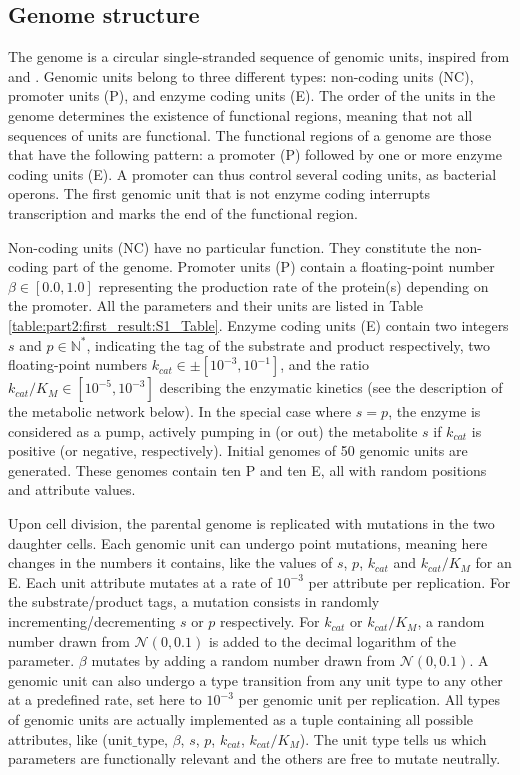 
\subsection{Genome structure}

The genome is a circular single-stranded sequence of genomic units, inspired from \cite{crombach-hogeweg-2008} and \cite{beslon-et-al-2010a}. Genomic units belong to three different types: non-coding units (NC), promoter units (P), and enzyme coding units (E). The order of the units in the genome determines the existence of functional regions, meaning that not all sequences of units are functional. The functional regions of a genome are those that have the following pattern: a promoter (P) followed by one or more enzyme coding units (E). A promoter can thus control several coding units, as bacterial operons. The first genomic unit that is not enzyme coding interrupts transcription and marks the end of the functional region. 

Non-coding units (NC) have no particular function. They constitute the non-coding part of the genome. Promoter units (P) contain a floating-point number $\beta \in [0.0, 1.0]$ representing the production rate of the protein(s) depending on the promoter.
All the parameters and their units are listed in Table \ref{table:part2:first_result:S1_Table}.
Enzyme coding units (E) contain two integers $s$ and $p \in \mathbb{N}^*$, indicating the tag of the substrate and product respectively, two floating-point numbers $k_{cat} \in \pm[10^{-3}, 10^{-1}]$, and the ratio $k_{cat}/K_M \in [10^{-5}, 10^{-3}]$ describing the enzymatic kinetics (see the description of the metabolic network below). In the special case where $s =p$, the enzyme is considered as a pump, actively pumping in (or out) the metabolite $s$ if $k_{cat}$ is positive (or negative, respectively).
Initial genomes of 50 genomic units are generated. These genomes contain ten P and ten E, all with random positions and attribute values.
 
Upon cell division, the parental genome is replicated with mutations in the two daughter cells. Each genomic unit can undergo point mutations, meaning here changes in the numbers it contains, like the values of $s$, $p$, $k_{cat}$ and $k_{cat}/K_M$ for an E. Each unit attribute mutates at a rate of $10^{-3}$ per attribute per replication.
For the substrate/product tags, a mutation consists in randomly incrementing/decrementing $s$ or $p$ respectively.
For $k_{cat}$ or $k_{cat}/K_M$, a random number drawn from $\mathcal{N}(0, 0.1)$ is added to the decimal logarithm of the parameter.
$\beta$ mutates by adding a random number drawn from $\mathcal{N}(0, 0.1)$.
A genomic unit can also undergo a type transition from any unit type to any other at a predefined rate, set here to $10^{-3}$ per genomic unit per replication. All types of genomic units are actually implemented as a tuple containing all possible attributes, like ($\text{unit\_type}$, $\beta$, $s$, $p$, $k_{cat}$, $k_{cat}/K_M$). The unit type tells us which parameters are functionally relevant and the others are free to mutate neutrally.

